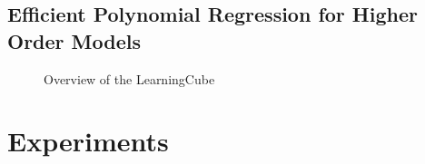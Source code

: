 \documentclass[letterpaper, 10 pt, conference]{ieeeconf}  %
\begin{document}
\subsection{Efficient Polynomial Regression for Higher Order Models}
\blindtext[6]
\begin{figure}[htpb]
      \centering
        \caption{Overview of the LearningCube}
        \label{fig:cube}
\end{figure}
\blindtext[1]
\clearpage

\section{Experiments}
\end{document}
